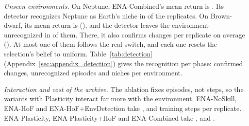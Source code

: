\textit{Unseen environments.} On Neptune, ENA-Combined's mean return is . Its detector recognizes Neptune as Earth's niche in  of the  replicates. On Brown-dwarf, its mean return is  (), and the detector leaves the environment unrecognized in  of them. There, it also confirms  changes per replicate on average (). At most one of them follows the real switch, and each one resets the selection's belief to uniform. Table~\ref{tab:detection} (Appendix~\ref{sec:appendix_detection}) gives the recognition per phase: confirmed changes, unrecognized episodes and niches per environment.

\textit{Interaction and cost of the archive.} The ablation fixes episodes, not steps, so the variants with Plasticity interact far more with the environment. ENA-NoSkill, ENA-HoF and ENA-HoF+EnvDetection take ,  and  training steps per replicate. ENA-Plasticity, ENA-Plasticity+HoF and ENA-Combined take ,  and .

